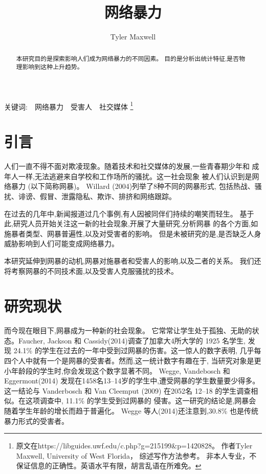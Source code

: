 \documentclass[a4paper]{article}
\title{网络暴力}
\author{Tyler Maxwell}
\begin{document}
\maketitle

\begin{abstract}
本研究目的是探索影响人们成为网络暴力的不同因素。
目的是分析出统计特征,是否物理影响到这种上升趋势。
\end{abstract}

关键词:~~网络暴力~~受害人~~社交媒体
\footnote{原文在https://libguides.uwf.edu/c.php?g=215199\&p=1420828。
作者Tyler Maxwell, University of West Florida，
综述写作方法参考\cite{rand2009}。
非本人专业，不保证信息的正确性。英语水平有限，胡言乱语在所难免。
}


\section{引言}
人们一直不得不面对欺凌现象。随着技术和社交媒体的发展,一些青春期少年和
成年人一样,无法逃避来自学校和工作场所的骚扰。这一社会现象
被人们认识到是网络暴力 (以下简称网暴)。
Willard (2004)\cite{Willard2004}列举了8种不同的网暴形式,
包括热战、骚扰、诽谤、假冒、泄露隐私、欺诈、排挤和网络跟踪。

在过去的几年中,新闻报道过几个事例,有人因被同伴们持续的嘲笑而轻生。
基于此,研究人员开始关注这一新的社会现象,开展了大量研究,分析网暴
的各个方面,如施暴者类型、网暴普遍性,以及对受害者的影响。
但是未被研究的是,是否缺乏人身威胁影响到人们可能变成网络暴力。

本研究延伸到网暴的动机,网暴对施暴者和受害人的影响,以及二者的关系。
我们还将考察网暴的不同技术面,以及受害人克服骚扰的技术。

\section{研究现状}
而今现在眼目下,网暴成为一种新的社会现象。
它常常让学生处于孤独、无助的状态。Faucher, Jackson 和
Cassidy(2014)\cite{faucher2014}调查了加拿大4所大学的 1925 名学生,
发现 24.1\% 的学生在过去的一年中受到过网暴的伤害。这一惊人的数字表明,
几乎每四个人中就有一个是网暴的受害者。然而,这一统计数字有趣在于,
当研究对象是更小年龄段的学生时,你会发现这个数字显著不同。
Wegge, Vandebosch 和 Eggermont(2014)\cite{wegge2014}
发现在1458名13--14岁的学生中,遭受网暴的学生数量要少得多。
这一结论与 Vanderbosch 和 Van Cleemput (2009)\cite{vander2009}
在2052名 12--18 的学生调查相似。在这项调查中, 11.1\% 的学生受到过网暴的
侵害。这一研究的结论是,网暴会随着学生年龄的增长而趋于普遍化。
Wegge 等人(2014)\cite{wegge2014}还注意到,30.8\% 也是传统暴力形式的受害者。
\end{document}

